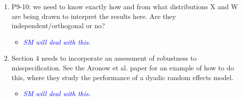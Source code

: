 \begin{enumerate}
	\item P9-10: we need to know exactly how and from what distributions X and W are being drawn to interpret the results here.  Are they independent/orthogonal or no?
	\begin{itemize}
		\item \textcolor{blue}{ \emph{
		SM will deal with this.
		}}
	\end{itemize}
	\item Section 4 needs to incorporate an assessment of robustness to misspecification.  See the Aronow et al. paper for an example of how to do this, where they study the performance of a dyadic random effects model.
	\begin{itemize}
		\item \textcolor{blue}{ \emph{
		SM will deal with this.
		}}
	\end{itemize}
\end{enumerate}

